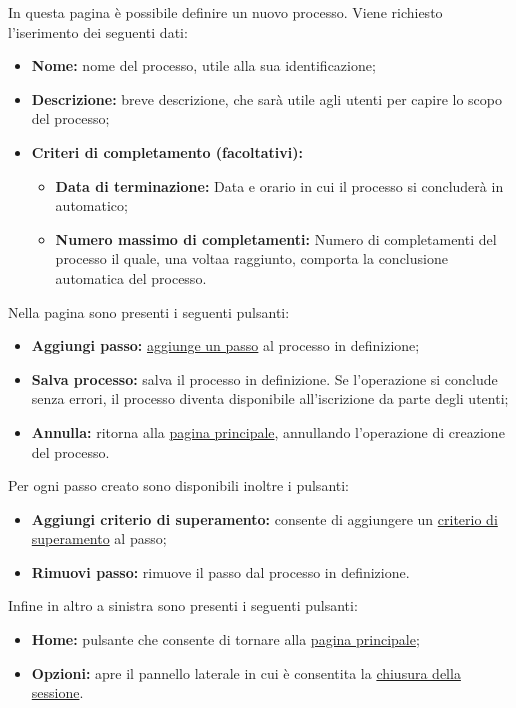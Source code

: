 In questa pagina è possibile definire un nuovo processo.
Viene richiesto l'iserimento dei seguenti dati:
\begin{itemize}
\item \textbf{Nome:} nome del processo, utile alla sua identificazione;
\item \textbf{Descrizione:} breve descrizione, che sarà utile agli utenti per capire lo scopo del processo;
\item \textbf{Criteri di completamento (facoltativi):} 
\begin{itemize}
\item \textbf{Data di terminazione:} Data e orario in cui il processo si concluderà in automatico;
\item \textbf{Numero massimo di completamenti:} Numero di completamenti del processo il quale, una voltaa raggiunto, comporta la conclusione automatica del processo.
\end{itemize}
\end{itemize}

Nella pagina sono presenti i seguenti pulsanti:
\begin{itemize}
\item \textbf{Aggiungi passo:} \hyperref[addstep]{aggiunge un passo} al processo in definizione;
\item \textbf{Salva processo:} salva il processo in definizione. Se l'operazione si conclude senza errori, il processo diventa disponibile all'iscrizione da parte degli utenti;
\item \textbf{Annulla:} ritorna alla \hyperref[home]{pagina principale}, annullando l'operazione di creazione del processo.
\end{itemize}
Per ogni passo creato sono disponibili inoltre i pulsanti:
\begin{itemize}
\item \textbf{Aggiungi criterio di superamento:} consente di aggiungere un \hyperref[vincoli]{criterio di superamento} al passo;
\item \textbf{Rimuovi passo:} rimuove il passo dal processo in definizione.
\end{itemize}
Infine in altro a sinistra sono presenti i seguenti pulsanti:
\begin{itemize}
\item \textbf{Home:} pulsante che consente di tornare alla \hyperref[home]{pagina principale};
\item \textbf{Opzioni:} apre il pannello laterale in cui è consentita la \hyperref[logout]{chiusura della sessione}.
\end{itemize}

